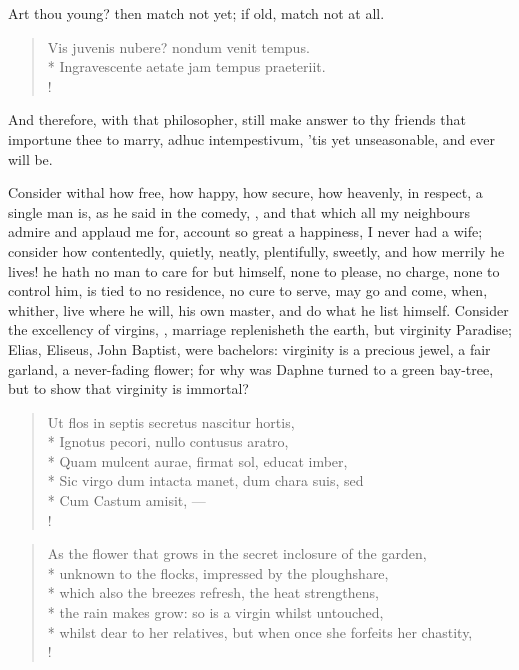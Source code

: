 Art thou young? then match not yet; if old, match not at all.

\begin{latin}%
\begin{verse}%
Vis juvenis nubere? nondum venit tempus.\\*
Ingravescente aetate jam tempus praeteriit.\\!
\end{verse}%
\end{latin}%

And therefore, with that philosopher, still make answer to thy friends
that importune thee to marry, adhuc intempestivum, 'tis yet
unseasonable, and ever will be.

Consider withal how free, how happy, how secure, how heavenly, in
respect, a single man is, as he said in the comedy, , and that which all my
neighbours admire and applaud me for, account so great a happiness, I
never had a wife; consider how contentedly, quietly, neatly,
plentifully, sweetly, and how merrily he lives! he hath no man to care
for but himself, none to please, no charge, none to control him, is
tied to no residence, no cure to serve, may go and come, when, whither,
live where he will, his own master, and do what he list himself.
Consider the excellency of virgins,  ,
marriage replenisheth the earth, but virginity Paradise; Elias,
Eliseus, John Baptist, were bachelors: virginity is a precious jewel, a
fair garland, a never-fading flower; for why was Daphne turned to
a green bay-tree, but to show that virginity is immortal?
%
\begin{latin}%
\begin{verse}%
Ut flos in septis secretus nascitur hortis,\\*
Ignotus pecori, nullo contusus aratro,\\*
Quam mulcent aurae, firmat sol, educat imber, \etc{}\\*
Sic virgo dum intacta manet, dum chara suis, sed\\*
Cum Castum amisit, \etc{}---\\!
\end{verse}%
\end{latin}%
\translationrule%
\begin{verse}%
As the flower that grows in the secret inclosure of the garden,\\*
unknown to the flocks, impressed by the ploughshare,\\*
which also the breezes refresh, the heat strengthens,\\*
the rain makes grow: so is a virgin whilst untouched,\\*
whilst dear to her relatives, but when once she forfeits her chastity, \etc{}\\!
\end{verse}%
%

